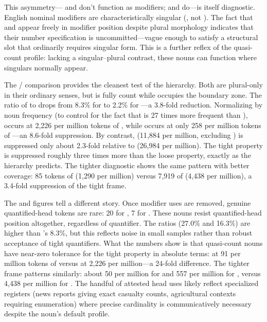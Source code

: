 \documentclass[12pt,a4paper]{article}
\begin{document}
This asymmetry--- and  don't function as modifiers;  and  do---is itself diagnostic. English nominal modifiers are characteristically singular (, not ). The fact that  and  appear freely in modifier position despite plural morphology indicates that their number specification is uncommitted---vague enough to satisfy a structural slot that ordinarily requires singular form. This is a further reflex of the quasi-count profile: lacking a singular--plural contrast, these nouns can function where singulars normally appear.

The / comparison provides the cleanest test of the hierarchy. Both are plural-only in their ordinary senses, but  is fully count while  occupies the boundary zone. The ratio of  to  drops from 8.3\% for  to 2.2\% for ---a 3.8-fold reduction. Normalizing by noun frequency (to control for the fact that  is 27 times more frequent than ),  occurs at 2{,}226 per million tokens of , while  occurs at only 258 per million tokens of ---an 8.6-fold suppression. By contrast,  (11{,}884 per million, excluding ) is suppressed only about 2.3-fold relative to  (26{,}984 per million). The tight property is suppressed roughly three times more than the loose property, exactly as the hierarchy predicts. The tighter diagnostic  shows the same pattern with better coverage: 85 tokens of  (1{,}290 per million) versus 7{,}919 of  (4{,}438 per million), a 3.4-fold suppression of the tight frame.

The  and  figures tell a different story. Once modifier uses are removed, genuine quantified-head tokens are rare: 20 for , 7 for . These nouns resist quantified-head position altogether, regardless of quantifier. The ratios (27.0\% and 16.3\%) are higher than 's 8.3\%, but this reflects noise in small samples rather than robust acceptance of tight quantifiers. What the numbers show is that quasi-count nouns have near-zero tolerance for the tight property in absolute terms:  at 91 per million tokens of  versus  at 2{,}226 per million---a 24-fold difference. The tighter frame  patterns similarly: about 50 per million for  and 557 per million for , versus 4{,}438 per million for . The handful of attested head uses likely reflect specialized registers (news reports giving exact casualty counts, agricultural contexts requiring enumeration) where precise cardinality is communicatively necessary despite the noun's default profile.
\end{document}
